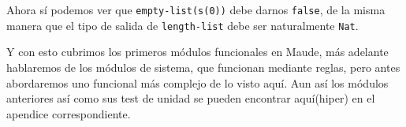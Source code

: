 Ahora sí podemos ver que \verb"empty-list(s(0))" debe darnos \texttt{false}, de la misma manera que el tipo de salida de \verb"length-list" debe ser naturalmente \texttt{Nat}.\par 

Y con esto cubrimos los primeros módulos funcionales en Maude, más adelante hablaremos de los módulos de sistema, que funcionan mediante reglas, pero antes abordaremos uno funcional más complejo de lo visto aquí. Aun así los módulos anteriores así como sus test de unidad se pueden encontrar aquí(hiper) en el apendice correspondiente.\par 


